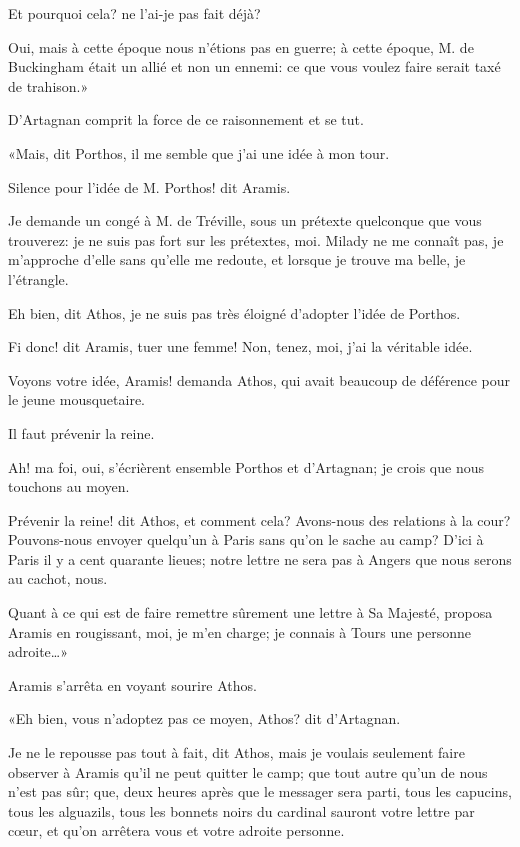 \speak  Et pourquoi cela? ne l'ai-je pas fait déjà? 

\speak  Oui, mais à cette époque nous n'étions pas en guerre; à cette époque, M. de Buckingham était un allié et non un ennemi: ce que vous voulez faire serait taxé de trahison.» 

D'Artagnan comprit la force de ce raisonnement et se tut. 

«Mais, dit Porthos, il me semble que j'ai une idée à mon tour. 

\speak  Silence pour l'idée de M. Porthos! dit Aramis. 

\speak  Je demande un congé à M. de Tréville, sous un prétexte quelconque que vous trouverez: je ne suis pas fort sur les prétextes, moi. Milady ne me connaît pas, je m'approche d'elle sans qu'elle me redoute, et lorsque je trouve ma belle, je l'étrangle. 

\speak  Eh bien, dit Athos, je ne suis pas très éloigné d'adopter l'idée de Porthos. 

\speak  Fi donc! dit Aramis, tuer une femme! Non, tenez, moi, j'ai la véritable idée. 

\speak  Voyons votre idée, Aramis! demanda Athos, qui avait beaucoup de déférence pour le jeune mousquetaire. 

\speak  Il faut prévenir la reine. 

\speak  Ah! ma foi, oui, s'écrièrent ensemble Porthos et d'Artagnan; je crois que nous touchons au moyen. 

\speak  Prévenir la reine! dit Athos, et comment cela? Avons-nous des relations à la cour? Pouvons-nous envoyer quelqu'un à Paris sans qu'on le sache au camp? D'ici à Paris il y a cent quarante lieues; notre lettre ne sera pas à Angers que nous serons au cachot, nous. 

\speak  Quant à ce qui est de faire remettre sûrement une lettre à Sa Majesté, proposa Aramis en rougissant, moi, je m'en charge; je connais à Tours une personne adroite\dots» 

Aramis s'arrêta en voyant sourire Athos. 

«Eh bien, vous n'adoptez pas ce moyen, Athos? dit d'Artagnan. 

\speak  Je ne le repousse pas tout à fait, dit Athos, mais je voulais seulement faire observer à Aramis qu'il ne peut quitter le camp; que tout autre qu'un de nous n'est pas sûr; que, deux heures après que le messager sera parti, tous les capucins, tous les alguazils, tous les bonnets noirs du cardinal sauront votre lettre par cœur, et qu'on arrêtera vous et votre adroite personne. 

